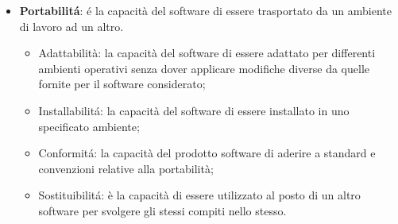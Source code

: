 \begin{itemize}
\begin{itemize}
\item Testabilità: la capacità di essere facilmente testato per validare le modifiche apportate al software.
\end{itemize}
\item \textbf{Portabilit\'a}: \'e la capacità del software di essere trasportato da un ambiente di lavoro ad un altro.
\begin{itemize}
\item Adattabilità: la capacità del software di essere adattato per differenti ambienti operativi senza dover applicare modifiche diverse da quelle fornite per il software considerato;
\item Installabilit\'a: la capacità del software di essere installato in uno specificato ambiente;
\item Conformit\'a: la capacità del prodotto software di aderire a standard e convenzioni relative alla portabilità;
\item Sostituibilit\'a: è la capacità di essere utilizzato al posto di un altro software per svolgere gli stessi compiti nello stesso.
\end{itemize}
\end{itemize}
